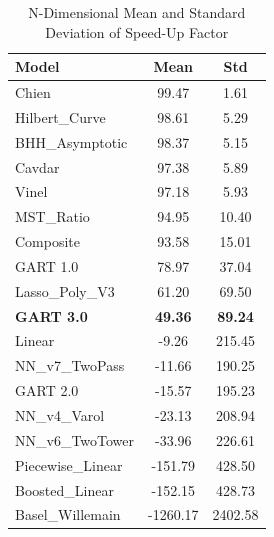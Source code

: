 \documentclass[11pt, a4paper]{article}
\begin{document}
\begin{table}[H]
    \centering
    \caption{N-Dimensional Mean and Standard Deviation of Speed-Up Factor}
    \label{tab:ndim_speedup}
    \begin{tabular}{lS[table-format=4.2]S[table-format=4.2]}
        \toprule
        \textbf{Model} & {\textbf{Mean}} & {\textbf{Std}} \\
        \midrule
        Chien & 99.47 & 1.61 \\
        Hilbert\_Curve & 98.61 & 5.29 \\
        BHH\_Asymptotic & 98.37 & 5.15 \\
        Cavdar & 97.38 & 5.89 \\
        Vinel & 97.18 & 5.93 \\
        MST\_Ratio & 94.95 & 10.40 \\
        Composite & 93.58 & 15.01 \\
        GART 1.0 & 78.97 & 37.04 \\
        Lasso\_Poly\_V3 & 61.20 & 69.50 \\
        \textbf{GART 3.0} & \textbf{49.36} & \textbf{89.24} \\
        Linear & -9.26 & 215.45 \\
        NN\_v7\_TwoPass & -11.66 & 190.25 \\
        GART 2.0 & -15.57 & 195.23 \\
        NN\_v4\_Varol & -23.13 & 208.94 \\
        NN\_v6\_TwoTower & -33.96 & 226.61 \\
        Piecewise\_Linear & -151.79 & 428.50 \\
        Boosted\_Linear & -152.15 & 428.73 \\
        Basel\_Willemain & -1260.17 & 2402.58 \\
        \bottomrule
    \end{tabular}
\end{table}
\end{document}
